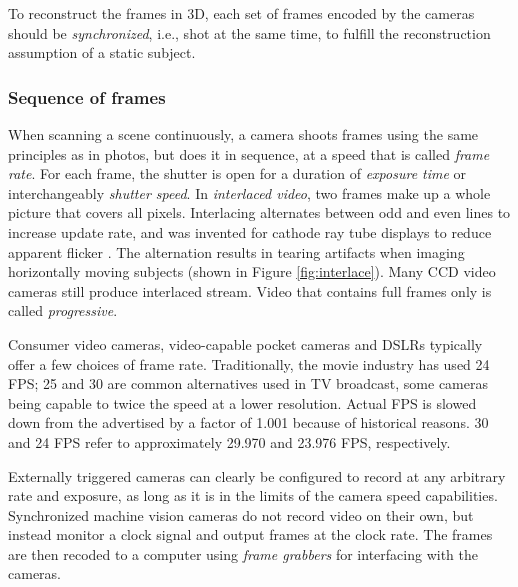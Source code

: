 To reconstruct the frames in 3D, each set of frames encoded by the cameras should be \emph{synchronized}, i.e., shot at the same time, to fulfill the reconstruction assumption of a static subject.


\subsubsection{Sequence of frames} %

When scanning a scene continuously, a camera shoots frames using the same principles as in photos, but does it in sequence, at a speed that is called \emph{frame rate}.
For each frame, the shutter is open for a duration of \emph{exposure time} or interchangeably \emph{shutter speed}.
In \emph{interlaced video}, two frames make up a whole picture that covers all pixels.
Interlacing alternates between odd and even lines to increase update rate, and was invented for cathode ray tube displays to reduce apparent flicker \cite{poynton1996technical}.
The alternation results in tearing artifacts when imaging horizontally moving subjects (shown in Figure \ref{fig:interlace}).
Many CCD video cameras still produce interlaced stream. %
Video that contains full frames only is called \emph{progressive}.



Consumer video cameras, video-capable pocket cameras and DSLRs typically offer a few choices of frame rate.
Traditionally, the movie industry has used 24 FPS; 25 and 30 are common alternatives used in TV broadcast, some cameras being capable to twice the speed at a lower resolution.
Actual FPS is slowed down from the advertised by a factor of 1.001 because of historical reasons. %
30 and 24 FPS refer to approximately 29.970 and 23.976 FPS, respectively.
\cite{musburger2010single}

Externally triggered cameras can clearly be configured to record at any arbitrary rate and exposure, as long as it is in the limits of the camera speed capabilities.
Synchronized machine vision cameras do not record video on their own, but instead monitor a clock signal and output frames at the clock rate.
The frames are then recoded to a computer using \emph{frame grabbers} for interfacing with the cameras.
\cite{hornberg2007handbook}

